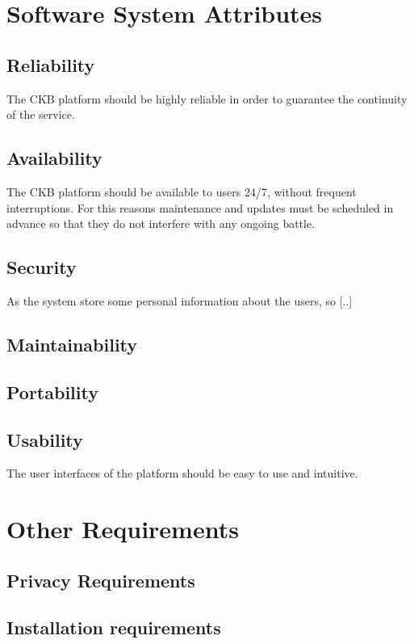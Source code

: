 \section{Software System Attributes}
\subsection{Reliability}
The CKB platform should be highly reliable in order to guarantee the continuity of the service. 
\subsection{Availability}
The CKB platform should be available to users 24/7, without frequent interruptions. For this reasons maintenance and updates must be scheduled in advance so that they do not interfere with any ongoing battle.
\subsection{Security}
As the system store some personal information about the users, so [..]
\subsection{Maintainability}
\subsection{Portability}
\subsection{Usability}
The user interfaces of the platform should be easy to use and intuitive.

\section{Other Requirements}
\subsection{Privacy Requirements}
\subsection{Installation requirements}

